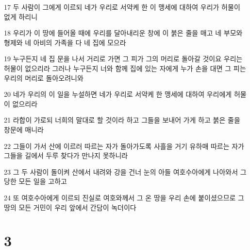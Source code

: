 \par 17 두 사람이 그에게 이르되 네가 우리로 서약케 한 이 맹세에 대하여 우리가 허물이 없게 하리니
\par 18 우리가 이 땅에 들어올 때에 우리를 달아내리운 창에 이 붉은 줄을 매고 네 부모와 형제와 네 아비의 가족을 다 네 집에 모으라
\par 19 누구든지 네 집 문을 나서 거리로 가면 그 피가 그의 머리로 돌아갈 것이요 우리는 허물이 없으리라 그러나 누구든지 너와 함께 집에 있는 자에게 누가 손을 대면 그 피는 우리의 머리로 돌아오려니와
\par 20 네가 우리의 이 일을 누설하면 네가 우리로 서약케 한 맹세에 대하여 우리에게 허물이 없으리라
\par 21 라합이 가로되 너희의 말대로 할 것이라 하고 그들을 보내어 가게 하고 붉은 줄을 창문에 매니라
\par 22 그들이 가서 산에 이르러 따르는 자가 돌아가도록 사흘을 거기 유하매 따르는 자가 그들을 길에서 두루 찾다가 만나지 못하니라
\par 23 그 두 사람이 돌이켜 산에서 내려와 강을 건너 눈의 아들 여호수아에게 나아와서 그 당한 모든 일을 고하고
\par 24 또 여호수아에게 이르되 진실로 여호와께서 그 온 땅을 우리 손에 붙이셨으므로 그 땅의 모든 거민이 우리 앞에서 간담이 녹더이다

\chapter{3}

